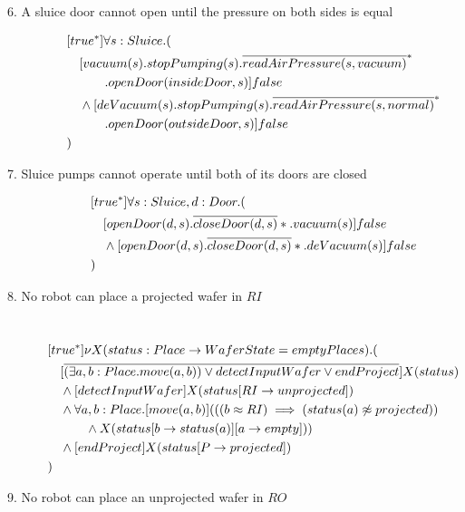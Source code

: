 \begin{description}
 \item[6. A sluice door cannot open until the pressure on both sides is equal]
	\begin{align*}
&[true^*]\forall s:Sluice . ( \\
&\tab  [vacuum(s).stopPumping(s).\overline{readAirPressure(s, vacuum)}^*\\
&\tab\tab\tab.openDoor(insideDoor,s)]false \\
&\tab  \wedge [deVacuum(s).stopPumping(s).\overline{readAirPressure(s, normal)}^*\\
&\tab\tab\tab.openDoor(outsideDoor,s)]false \\
&)		
	\end{align*}
	
 \item[7. Sluice pumps cannot operate until both of its doors are closed]
 
 \begin{align*}
 &[true^*]\forall s:Sluice, d:Door . ( \\
 &\hspace{1em} [openDoor(d,s).\overline{closeDoor(d,s)}*.vacuum(s)]false \\
 &\hspace{1em} \wedge [openDoor(d,s).\overline{closeDoor(d,s)}*.deVacuum(s)]false \\
 &)
 \end{align*}

 \item[8. No robot can place a projected wafer in $RI$]\mbox{}\\

\begin{align*}
&[true^*] \nu X(status:Place \to WaferState=emptyPlaces).( \\
&\tab  [\overline{(\exists a,b:Place.move(a,b)) \vee detectInputWafer \vee endProject}]X(status) \\
&\tab  \wedge [detectInputWafer]X(status[RI \to unprojected]) \\
&\tab  \wedge \forall a,b:Place.[move(a, b)](((b \approx RI) \implies (status(a) \not \approx projected)) \\
&\tab\tab\tab \wedge X(status[b \to status(a)][a \to empty])) \\
&\tab  \wedge [endProject]X(status[P \to projected]) \\
&)
\end{align*}

 \item[9. No robot can place an unprojected wafer in $RO$] \mbox{}\\


\end{description}

